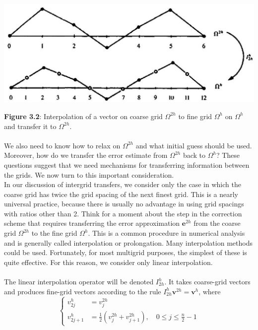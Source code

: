 \documentclass[11pt]{book}
\begin{document}
\begin{center}
\includegraphics[max width=\textwidth]{2023_10_10_f3de0b9400b097aecf14g-047}
\end{center} 
\textbf{Figure 3.2}: Interpolation of a vector on coarse grid $\Omega^{2 h}$ to fine grid $\Omega^{h}$ on $\Omega^{h}$ and transfer it to $\Omega^{2 h}$.\\ \\
We also need to know how to relax on $\Omega^{2 h}$ and what initial guess should be used. Moreover, how do we transfer the error estimate from $\Omega^{2 h}$ back to $\Omega^{h}$? These questions suggest that we need mechanisms for transferring information between the grids. We now turn to this important consideration. \\
In our discussion of intergrid transfers, we consider only the case in which the coarse grid has twice the grid spacing of the next finest grid. This is a nearly universal practice, because there is usually no advantage in using grid spacings with ratios other than 2. Think for a moment about the step in the correction scheme that requires transferring the error approximation $\mathbf{e}^{2 h}$ from the coarse grid $\Omega^{2 h}$ to the fine grid $\Omega^{h}$. This is a common procedure in numerical analysis and is generally called interpolation or prolongation. Many interpolation methods could be used. Fortunately, for most multigrid purposes, the simplest of these is quite effective. For this reason, we consider only linear interpolation. \\ \\
The linear interpolation operator will be denoted $I_{2 h}^{h}$. It takes coarse-grid vectors and produces fine-grid vectors according to the rule $I_{2 h}^{h} \mathbf{v}^{2 h}=\mathbf{v}^{h}$, where
$$
\begin{cases}
v_{2 j}^{h} & =v_{j}^{2 h} \\
v_{2 j+1}^{h} & =\frac{1}{2}\left(v_{j}^{2 h}+v_{j+1}^{2 h}\right), \quad 0 \leq j \leq \frac{n}{2}-1
\end{cases}
$$
\end{document}
